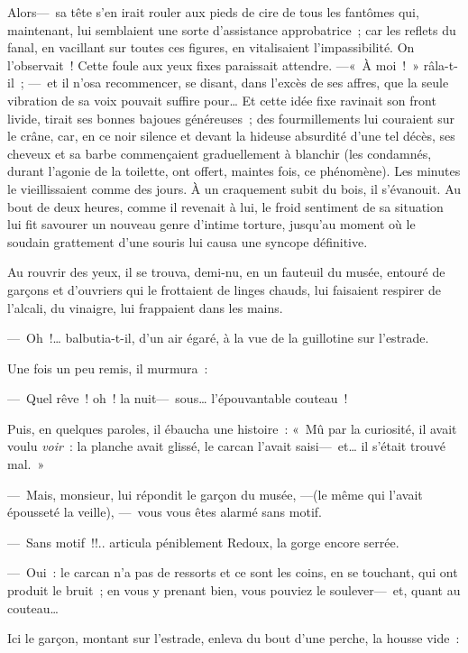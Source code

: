 \documentclass[french,twoside]{book} %
\begin{document}
Alors— sa tête s’en irait rouler aux pieds de cire de tous les fantômes qui, maintenant, lui semblaient une sorte d’assistance approbatrice ; car les reflets du fanal, en vacillant sur toutes ces figures, en vitalisaient l’impassibilité. On l’observait ! Cette foule aux yeux fixes paraissait attendre. —« À moi ! » râla-t-il ; — et il n’osa recommencer, se disant, dans l’excès de ses affres, que la seule vibration de sa voix pouvait suffire pour… Et cette idée fixe ravinait son front livide, tirait ses bonnes bajoues généreuses ; des fourmillements lui couraient sur le crâne, car, en ce noir silence et devant la hideuse absurdité d’une tel décès, ses cheveux et sa   barbe commençaient graduellement à blanchir (les condamnés, durant l’agonie de la toilette, ont offert, maintes fois, ce phénomène). Les minutes le vieillissaient comme des jours. À un craquement subit du bois, il s’évanouit. Au bout de deux heures, comme il revenait à lui, le froid sentiment de sa situation lui fit savourer un nouveau genre d’intime torture, jusqu’au moment où le soudain grattement d’une souris lui causa une syncope définitive.\par
Au rouvrir des yeux, il se trouva, demi-nu, en un fauteuil du musée, entouré de garçons et d’ouvriers qui le frottaient de linges chauds, lui faisaient respirer de l’alcali, du vinaigre, lui frappaient dans les mains.\par
— Oh !… balbutia-t-il, d’un air égaré, à la vue de la guillotine sur l’estrade.\par
Une fois un peu remis, il murmura :\par
— Quel rêve ! oh ! la nuit— sous… l’épouvantable couteau !\par
Puis, en quelques paroles, il ébaucha une histoire : « Mû par la curiosité, il avait voulu   \emph{voir} : la planche avait glissé, le carcan l’avait saisi— et… il s’était trouvé mal. »\par
— Mais, monsieur, lui répondit le garçon du musée, —(le même qui l’avait épousseté la veille), — vous vous êtes alarmé sans motif.\par
— Sans motif !!.. articula péniblement Redoux, la gorge encore serrée.\par
— Oui : le carcan n’a pas de ressorts et ce sont les coins, en se touchant, qui ont produit le bruit ; en vous y prenant bien, vous pouviez le soulever— et, quant au couteau…\par
Ici le garçon, montant sur l’estrade, enleva du bout d’une perche, la housse vide :\par
\end{document}
